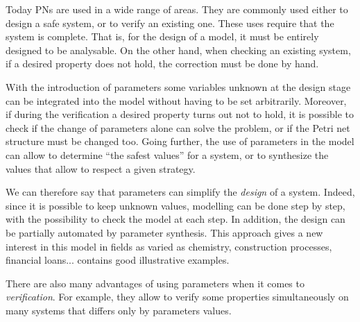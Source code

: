 
Today \acp{PN} are used in a wide range of areas.
They are commonly used either to design a safe system, or to verify an existing one.
These uses require that the system is complete.
That is, for the design of a model, it must be entirely designed to be analysable.
On the other hand, when checking an existing system, if a desired property does not hold, the correction must be done by hand.

With the introduction of parameters some variables unknown at the design stage can be integrated into the model without having to be set arbitrarily. Moreover, if during the verification a desired property turns out not to hold, it is possible to check if the change of parameters alone can solve the problem, or if the Petri net structure must be changed too. Going further, the use of parameters in the model can allow to determine ``the safest values'' for a system, or to synthesize the values that allow to respect a given strategy.

We can therefore say that parameters can simplify the \emph{design} of a system. Indeed, since it is possible to keep unknown values, modelling can be done step by step, with the possibility to check the model at each step.
In addition, the design can be partially automated by parameter synthesis.
This approach gives a new interest in this model in fields as varied as chemistry, construction processes, financial loans...
\cite{David17} contains good illustrative examples.

There are also many advantages of using parameters when it comes to \emph{verification}.
For example, they allow to verify some properties simultaneously on many systems that differs only by parameters values.
